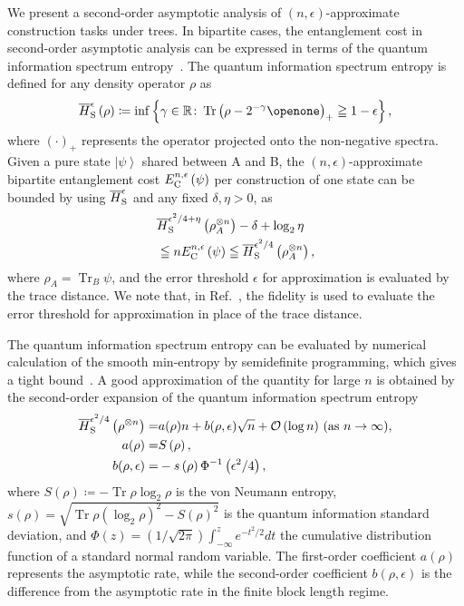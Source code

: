 \documentclass[preprintnumbers,aps,amsmath,amssymb,pra,twocolumn,showpacs,superscriptaddress,floatfix]{revtex4-1}
\def\Ket#1{\left|#1\right\rangle}
\DeclareMathOperator{\tr}{Tr}
\theoremstyle{plain}
\theoremstyle{definition}
\theoremstyle{remark}
\begin{document}
We present a second-order asymptotic analysis of $(n,\epsilon)$-approximate construction tasks under trees.   In bipartite cases, the entanglement cost in second-order asymptotic analysis can be expressed in terms of the quantum information spectrum entropy~\cite{RefWorks:160}.
The quantum information spectrum entropy is defined for any density operator $\rho$ as
\[
    \overline{H}_{\textup{S}}^{\epsilon}\left(\rho\right)\coloneqq \inf\left\{\gamma\in\mathbb{R}\colon\tr{\left(\rho - 2^{- \gamma}\openone\right)} _+ \geqq 1-\epsilon\right\},
\]
where ${(\cdot)}_+$ represents the operator projected onto the non-negative spectra.
Given a pure state $\Ket{\psi}$ shared between A and B, the $(n,\epsilon)$-approximate bipartite entanglement cost $E_{\textup{C}}^{n,\epsilon}\left(\psi\right)$ per construction of one state can be bounded by using $\overline{H}_{\textup{S}}^{\epsilon}$ and any fixed $\delta, \eta>0$, as
\begin{equation*}
    \begin{split}
        &\overline{H}_{\textup{S}}^{\epsilon^2/4+\eta}\left(\rho_A^{\otimes n}\right)-\delta+\log_2 \eta\\
        &\leqq n E_{\textup{C}}^{n,\epsilon}\left(\psi\right) \leqq \overline{H}_{\textup{S}}^{\epsilon^2/4}\left(\rho_A^{\otimes n}\right),
\end{split}
\end{equation*}
where $\rho_A=\tr_B \psi$, and the error threshold $\epsilon$ for approximation is evaluated by the trace distance.  We note that, in Ref.~\cite{RefWorks:160}, the fidelity is used to evaluate the error threshold for approximation in place of the trace distance.

The quantum information spectrum entropy can be evaluated by numerical calculation of the smooth min-entropy by semidefinite programming, which gives a tight bound~\cite{HierarchyOfInformationQuantities}.   A good approximation of the quantity for large $n$ is obtained by the second-order expansion of the quantum information spectrum entropy~\cite{RefWorks:160}
\begin{equation*}
    \begin{split}
        \overline{H}_{\textup{S}}^{\epsilon^2/4}\left(\rho^{\otimes n}\right)=&a(\rho)n+b(\rho,\epsilon)\sqrt{n}+\mathcal{O}\left(\log n\right) \,(\textup{as } n\rightarrow\infty),\\
        a(\rho) =& S\left(\rho\right),\\
        b(\rho,\epsilon)=&-s\left(\rho\right)\Phi^{-1}\left(\epsilon^2/4\right),
\end{split}
\end{equation*}
where  $S(\rho)\coloneqq-\tr\rho\log_2\rho$ is the von Neumann entropy,
$s\left(\rho\right)= \sqrt{\tr\rho{\left(\log_2 \rho\right)} ^2 - {S\left(\rho\right)} ^2}$ is
the quantum information standard deviation, and
$\Phi\left(z\right)=\left(1/{\sqrt{2\pi}}\right)\int_{-\infty}^{z}e^{-t^2/2}dt$
the cumulative distribution function of a standard normal random variable.  The first-order coefficient $a(\rho)$ represents the asymptotic rate, while the second-order coefficient $b(\rho,\epsilon)$ is the difference from the asymptotic rate in the finite block length regime.
\end{document}
